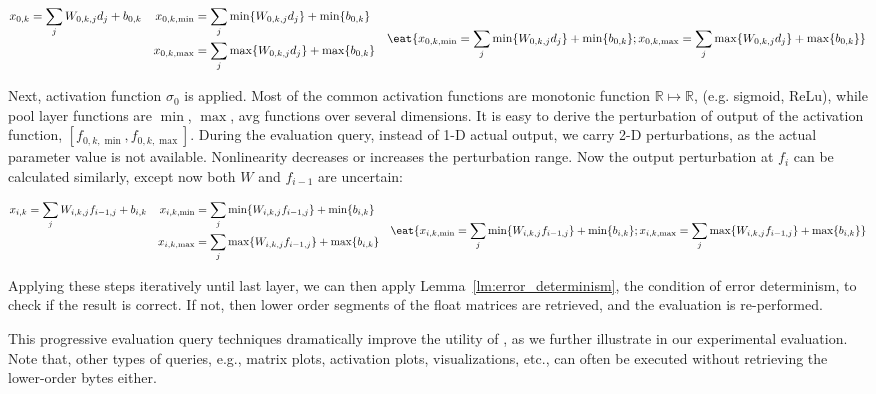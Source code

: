 \documentclass[conference]{IEEEtran}
\begin{document}
{\small{
\begin{displaymath}
\begin{aligned}
x_{0,k} &= \sum_j W_{0,k,j} d_j + b_{0,k} & 
x_{0,k,\min} &= \sum_j \min\{W_{0,k,j} d_j\} + \min\{ b_{0,k} \} &\\
& & x_{0,k,\max} &= \sum_j \max\{W_{0,k,j} d_j\} + \max\{ b_{0,k} \} & \\
\end{aligned}
\eat{
x_{0,k,\min} = \sum_j \min\{W_{0,k,j} d_j\} + \min\{ b_{0,k} \}; 
x_{0,k,\max} = \sum_j \max\{W_{0,k,j} d_j\} + \max\{ b_{0,k} \} 
}
\end{displaymath}
}}

{\noindent}Next, activation function $\sigma_0$ is applied. Most of the common activation functions are monotonic function $\mathbb{R}\mapsto\mathbb{R}$, (e.g. sigmoid, ReLu), while pool layer functions are $\min$, $\max$, avg functions over several dimensions. It is easy to derive the perturbation of output of the activation function, $[f_{0,k,\min}, f_{0,k,\max}]$. During the evaluation query, instead of 1-D actual output, we carry 2-D perturbations, as the actual parameter value is not available. Nonlinearity decreases or increases the perturbation range. Now the output perturbation at $f_i$ can be calculated similarly, except now both $W$ and $f_{i-1}$ are uncertain:

{\small{
\begin{displaymath}
\begin{aligned}
x_{i,k} &= \sum_j W_{i,k,j} f_{i-1,j} + b_{i,k} & 
x_{i,k,\min} &= \sum_j \min\{W_{i,k,j} f_{i-1,j}\} + \min\{ b_{i,k} \} &\\
& & x_{i,k,\max} &= \sum_j \max\{W_{i,k,j} f_{i-1,j}\} + \max\{ b_{i,k} \} & \\
\end{aligned}
\eat{
x_{i,k,\min} = \sum_j \min\{W_{i,k,j} f_{i-1,j}\} + \min\{ b_{i,k} \}; 
x_{i,k,\max} = \sum_j \max\{W_{i,k,j} f_{i-1,j}\} + \max\{ b_{i,k} \} 
}
\end{displaymath}
}}

{\noindent}Applying these steps iteratively until last layer,  we can then apply Lemma~\ref{lm:error_determinism}, the condition of error determinism, to check if the result is correct. If not, then lower order segments of the float matrices are retrieved, and the evaluation is re-performed.


This progressive evaluation query techniques dramatically improve the utility of \weightstore, as we further illustrate in our experimental evaluation. 
Note that, other types of queries, e.g., matrix plots, activation plots, visualizations, etc., can often be executed without retrieving the lower-order bytes either.
\end{document}

